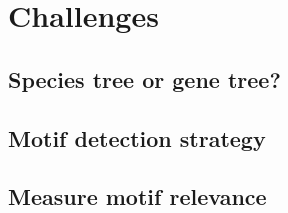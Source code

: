 \section{Challenges}

\subsection{Species tree or gene tree?}

\subsection{Motif detection strategy}

\subsection{Measure motif relevance}